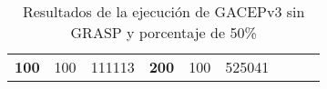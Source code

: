 \begin{table}[]
\begin{tabular}{|ccrccrccc}
\multicolumn{1}{|c|}{\multirow{-39}{*}{\cellcolor[HTML]{FFFFC7}\textbf{100}}} & \multicolumn{1}{c|}{\multirow{-9}{*}{\cellcolor[HTML]{DDFDFF}100}} & \multicolumn{1}{r|}{\cellcolor[HTML]{DAE8FC}111113}    & \multicolumn{1}{c|}{\multirow{-39}{*}{\cellcolor[HTML]{FFFFC7}\textbf{200}}} & \multicolumn{1}{c|}{\multirow{-10}{*}{\cellcolor[HTML]{DDFDFF}100}} & \multicolumn{1}{r|}{\cellcolor[HTML]{DDFDFF}525041}    &                                                                              &                                                                    &                                                        \\ \cline{1-6}
\end{tabular}
\caption{\label{GACEPv3c50woGRASP}Resultados de la ejecución de GACEPv3 sin GRASP y porcentaje de 50\%}
\end{table}
